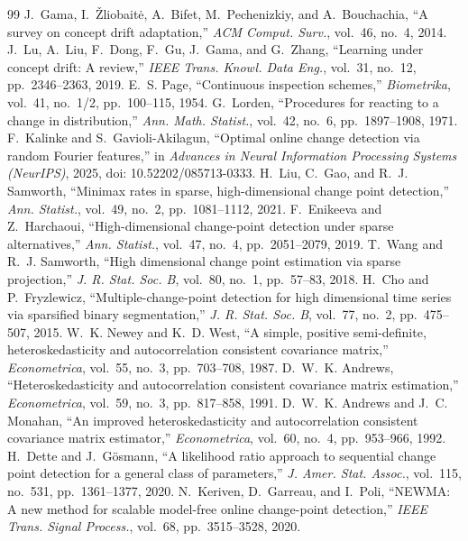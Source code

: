 \documentclass[conference]{IEEEtran}
\begin{document}
\begin{thebibliography}{99}
 J.~Gama, I.~\v{Z}liobait\.{e}, A.~Bifet, M.~Pechenizkiy, and A.~Bouchachia, ``A survey on concept drift adaptation,'' \emph{ACM Comput. Surv.}, vol.~46, no.~4, 2014.
 J.~Lu, A.~Liu, F.~Dong, F.~Gu, J.~Gama, and G.~Zhang, ``Learning under concept drift: A review,'' \emph{IEEE Trans. Knowl. Data Eng.}, vol.~31, no.~12, pp.~2346--2363, 2019.
 E.~S. Page, ``Continuous inspection schemes,'' \emph{Biometrika}, vol.~41, no.~1/2, pp.~100--115, 1954.
 G.~Lorden, ``Procedures for reacting to a change in distribution,'' \emph{Ann. Math. Statist.}, vol.~42, no.~6, pp.~1897--1908, 1971.
 F.~Kalinke and S.~Gavioli-Akilagun, ``Optimal online change detection via random Fourier features,'' in \emph{Advances in Neural Information Processing Systems (NeurIPS)}, 2025, doi: 10.52202/085713-0333.
 H.~Liu, C.~Gao, and R.~J. Samworth, ``Minimax rates in sparse, high-dimensional change point detection,'' \emph{Ann. Statist.}, vol.~49, no.~2, pp.~1081--1112, 2021.
 F.~Enikeeva and Z.~Harchaoui, ``High-dimensional change-point detection under sparse alternatives,'' \emph{Ann. Statist.}, vol.~47, no.~4, pp.~2051--2079, 2019.
 T.~Wang and R.~J. Samworth, ``High dimensional change point estimation via sparse projection,'' \emph{J. R. Stat. Soc. B}, vol.~80, no.~1, pp.~57--83, 2018.
 H.~Cho and P.~Fryzlewicz, ``Multiple-change-point detection for high dimensional time series via sparsified binary segmentation,'' \emph{J. R. Stat. Soc. B}, vol.~77, no.~2, pp.~475--507, 2015.
 W.~K. Newey and K.~D. West, ``A simple, positive semi-definite, heteroskedasticity and autocorrelation consistent covariance matrix,'' \emph{Econometrica}, vol.~55, no.~3, pp.~703--708, 1987.
 D.~W.~K. Andrews, ``Heteroskedasticity and autocorrelation consistent covariance matrix estimation,'' \emph{Econometrica}, vol.~59, no.~3, pp.~817--858, 1991.
 D.~W.~K. Andrews and J.~C. Monahan, ``An improved heteroskedasticity and autocorrelation consistent covariance matrix estimator,'' \emph{Econometrica}, vol.~60, no.~4, pp.~953--966, 1992.
 H.~Dette and J.~G\"osmann, ``A likelihood ratio approach to sequential change point detection for a general class of parameters,'' \emph{J. Amer. Stat. Assoc.}, vol.~115, no.~531, pp.~1361--1377, 2020.
 N.~Keriven, D.~Garreau, and I.~Poli, ``NEWMA: A new method for scalable model-free online change-point detection,'' \emph{IEEE Trans. Signal Process.}, vol.~68, pp.~3515--3528, 2020.
\end{thebibliography}
\end{document}
